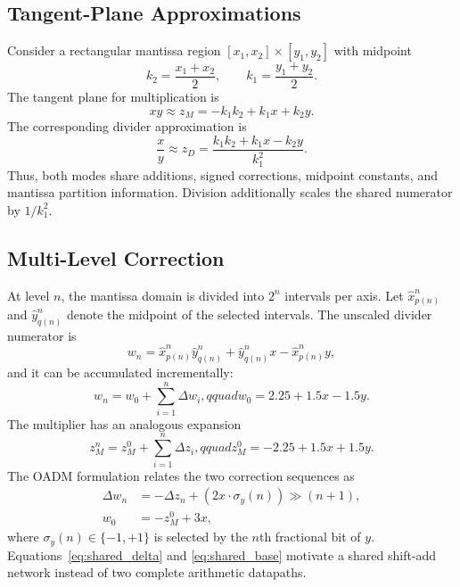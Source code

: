 \documentclass[conference]{IEEEtran}
\begin{document}
\subsection{Tangent-Plane Approximations}
Consider a rectangular mantissa region
$[x_1,x_2]\times[y_1,y_2]$ with midpoint
\begin{equation}
  k_2=\frac{x_1+x_2}{2}, \qquad k_1=\frac{y_1+y_2}{2}.
\end{equation}
The tangent plane for multiplication is
\begin{equation}
  xy \approx z_M=-k_1k_2+k_1x+k_2y.
  \label{eq:mulplane}
\end{equation}
The corresponding divider approximation is
\begin{equation}
  \frac{x}{y}\approx z_D=
  \frac{k_1k_2+k_1x-k_2y}{k_1^2}.
  \label{eq:divplane}
\end{equation}
Thus, both modes share additions, signed corrections, midpoint constants, and
mantissa partition information. Division additionally scales the shared
numerator by $1/k_1^2$.

\subsection{Multi-Level Correction}
At level $n$, the mantissa domain is divided into $2^n$ intervals per axis.
Let $\hat{x}^{n}_{p(n)}$ and $\hat{y}^{n}_{q(n)}$ denote the midpoint of the
selected intervals. The unscaled divider numerator is
\begin{equation}
  w_n=\hat{x}^{n}_{p(n)}\hat{y}^{n}_{q(n)}
      +\hat{y}^{n}_{q(n)}x-\hat{x}^{n}_{p(n)}y,
\end{equation}
and it can be accumulated incrementally:
\begin{equation}
  w_n=w_0+\sum_{i=1}^{n}\Delta w_i,qquad
  w_0=2.25+1.5x-1.5y.
  \label{eq:divcorrection}
\end{equation}
The multiplier has an analogous expansion
\begin{equation}
  z_M^n=z_M^0+\sum_{i=1}^{n}\Delta z_i,qquad
  z_M^0=-2.25+1.5x+1.5y.
  \label{eq:mulcorrection}
\end{equation}
The OADM formulation relates the two correction sequences as
\begin{align}
  \Delta w_n &= -\Delta z_n
    + \left(2x\cdot\sigma_y(n)\right)\gg(n+1),
    \label{eq:shared_delta}\\
  w_0 &= -z_M^0+3x,
  \label{eq:shared_base}
\end{align}
where $\sigma_y(n)\in\{-1,+1\}$ is selected by the $n$th fractional bit of
$y$. Equations~\eqref{eq:shared_delta} and \eqref{eq:shared_base} motivate a
shared shift-add network instead of two complete arithmetic datapaths.
\end{document}
